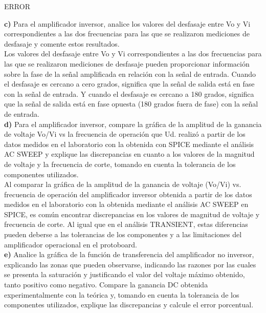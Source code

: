 \documentclass[12pt]{article}
\begin{document}
	ERROR
	
	\noindent \textbf{c)} Para el amplificador inversor, analice los valores del desfasaje entre Vo y Vi correspondientes a las dos frecuencias para las que se realizaron mediciones de desfasaje y comente estos resultados.\\
	
	Los valores del desfasaje entre Vo y Vi correspondientes a las dos frecuencias para las que se realizaron mediciones de desfasaje pueden proporcionar información sobre la fase de la señal amplificada en relación con la señal de entrada. Cuando el desfasaje es cercano a cero grados, significa que la señal de salida está en fase con la señal de entrada. Y cuando el desfasaje es cercano a 180 grados, significa que la señal de salida está en fase opuesta (180 grados fuera de fase) con la señal de entrada.\\
	
	\noindent \textbf{d)} Para el amplificador inversor, compare la gráfica de la amplitud de la ganancia de voltaje Vo/Vi vs la frecuencia de operación que Ud. realizó a partir de los datos medidos en el laboratorio con la obtenida con SPICE mediante el análisis AC SWEEP y explique las discrepancias en cuanto a los valores de la magnitud de voltaje y la frecuencia de corte, tomando en cuenta la tolerancia de los componentes utilizados.\\
	
	Al comparar la gráfica de la amplitud de la ganancia de voltaje (Vo/Vi) vs. frecuencia de operación del amplificador inversor obtenida a partir de los datos medidos en el laboratorio con la obtenida mediante el análisis AC SWEEP en SPICE, es común encontrar discrepancias en los valores de magnitud de voltaje y frecuencia de corte. Al igual que en el análisis TRANSIENT, estas diferencias pueden deberse a las tolerancias de los componentes y a las limitaciones del amplificador operacional en el protoboard.\\
	
	\noindent \textbf{e)} Analice la gráfica de la función de transferencia del amplificador no inversor, explicando las zonas que pueden observarse, indicando las razones por las cuales se presenta la saturación y justificando el valor del voltaje máximo obtenido, tanto positivo como negativo. Compare la ganancia DC obtenida experimentalmente con la teórica y, tomando en cuenta la tolerancia de los componentes utilizados, explique las discrepancias y calcule el error porcentual.\\
	
\end{document}
